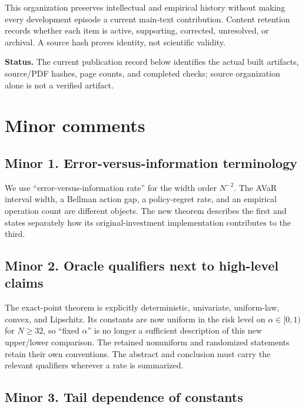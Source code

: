 This organization preserves intellectual and empirical history without making every development episode a current main-text contribution. Content retention records whether each item is active, supporting, corrected, unresolved, or archival. A source hash proves identity, not scientific validity.

\textbf{Status.} The current publication record below identifies the actual built artifacts, source/PDF hashes, page counts, and completed checks; source organization alone is not a verified artifact.

\hypertarget{minor-comments}{%
\section{Minor comments}\label{minor-comments}}

\hypertarget{minor-1.-error-versus-information-terminology}{%
\subsection{Minor 1. Error-versus-information terminology}\label{minor-1.-error-versus-information-terminology}}

We use ``error-versus-information rate'' for the width order \(N^{-2}\). The AVaR interval width, a Bellman action gap, a policy-regret rate, and an empirical operation count are different objects. The new theorem describes the first and states separately how its original-investment implementation contributes to the third.

\hypertarget{minor-2.-oracle-qualifiers-next-to-high-level-claims}{%
\subsection{Minor 2. Oracle qualifiers next to high-level claims}\label{minor-2.-oracle-qualifiers-next-to-high-level-claims}}

The exact-point theorem is explicitly deterministic, univariate, uniform-law, convex, and Lipschitz. Its constants are now uniform in the risk level on \(\alpha\in[0,1)\) for \(N\ge32\), so ``fixed \ensuremath{\alpha}'' is no longer a sufficient description of this new upper/lower comparison. The retained nonuniform and randomized statements retain their own conventions. The abstract and conclusion must carry the relevant qualifiers wherever a rate is summarized.

\hypertarget{minor-3.-tail-dependence-of-constants}{%
\subsection{Minor 3. Tail dependence of constants}\label{minor-3.-tail-dependence-of-constants}}

